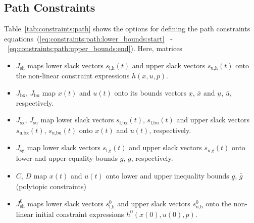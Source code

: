 \documentclass[english]{article}
\newcommand{\ind}[1]{_{\textrm{#1}}}
\newcommand{\initial}{^{\textrm{0}}}
\begin{document}
\subsection{Path Constraints}\label{sec:constraints:path}
%
Table~\ref{tab:constraints:path} shows the options for defining the path constraints equations~(\ref{eq:constraints:path:lower_bounds:start} ~-~\ref{eq:constraints:path:upper_bounds:end}).
Here, matrices
\begin{itemize}
    \item $J\ind{sh}$ maps lower slack vectors $s\ind{l,h}(t)$ and upper slack vectors $s\ind{u,h}(t)$ onto the non-linear constraint expressions $h(x,u,p)$.
    \item $J\ind{bx}$, $J\ind{bu}$ map $x(t)$ and $u(t)$ onto its bounds vectors $\underline{x}$, $\bar{x}$ and $\underline{u}$, $\bar{u}$, respectively.
    \item $J\ind{sx}$, $J\ind{su}$ map lower slack vectors $s\ind{l,bx}(t)$, $s\ind{l,bu}(t)$ and upper slack vectors $s\ind{u,bx}(t)$, $s\ind{u,bu}(t)$ onto $x(t)$ and $u(t)$, respectively.
    \item $J\ind{sg}$ map lower slack vectors $s\ind{l,g}(t)$ and upper slack vectors $s\ind{u,g}(t)$ onto lower and upper equality bounds $\underline{g}$, $\bar{g}$, respectively.
    \item $C$, $D$ map $x(t)$ and $u(t)$ onto lower and upper inequality bounds $\underline{g}$, $\bar{g}$ (polytopic constraints)
    \item $J\ind{sh}\initial$ maps lower slack vectors $s\ind{l,h}\initial$ and upper slack vectors $s\ind{u,h}\initial$ onto the non-linear initial constraint expressions $h\initial(x(0),u(0),p)$.
\end{itemize}
%
\end{document}
